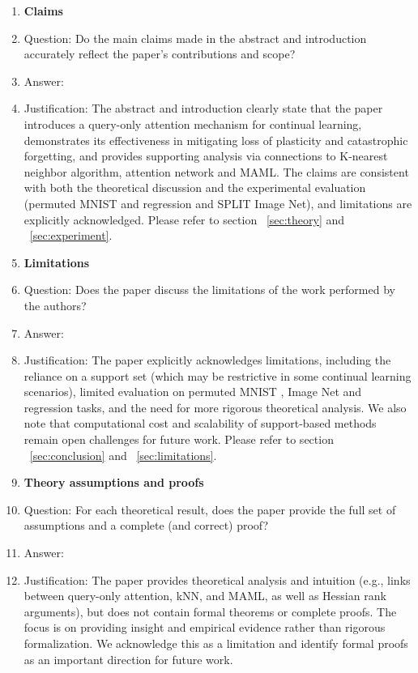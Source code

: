 \documentclass{article}
\begin{document}
\begin{enumerate}

\item {\bf Claims}
    \item[] Question: Do the main claims made in the abstract and introduction accurately reflect the paper's contributions and scope?
    \item[] Answer: \answerYes{} %
    \item[] Justification: The abstract and introduction clearly state that the paper introduces a query-only attention mechanism for continual learning, demonstrates its effectiveness in mitigating loss of plasticity and catastrophic forgetting, and provides supporting analysis via connections to K-nearest neighbor algorithm, attention network and MAML. The claims are consistent with both the theoretical discussion and the experimental evaluation (permuted MNIST and regression and SPLIT Image Net), and limitations are explicitly acknowledged. Please refer to section ~\ref{sec:theory} and ~\ref{sec:experiment}.

\item {\bf Limitations}
    \item[] Question: Does the paper discuss the limitations of the work performed by the authors?
    \item[] Answer:  \answerYes{} %
    \item[] Justification: The paper explicitly acknowledges limitations, including the reliance on a support set (which may be restrictive in some continual learning scenarios), limited evaluation on permuted MNIST , Image Net and regression tasks, and the need for more rigorous theoretical analysis. We also note that computational cost and scalability of support-based methods remain open challenges for future work. Please refer to section ~\ref{sec:conclusion} and ~\ref{sec:limitations}.
 

\item {\bf Theory assumptions and proofs}
    \item[] Question: For each theoretical result, does the paper provide the full set of assumptions and a complete (and correct) proof?
    \item[] Answer: \answerNo{} %
    \item[] Justification: The paper provides theoretical analysis and intuition (e.g., links between query-only attention, kNN, and MAML, as well as Hessian rank arguments), but does not contain formal theorems or complete proofs. The focus is on providing insight and empirical evidence rather than rigorous formalization. We acknowledge this as a limitation and identify formal proofs as an important direction for future work.



\end{enumerate}
\end{document}

